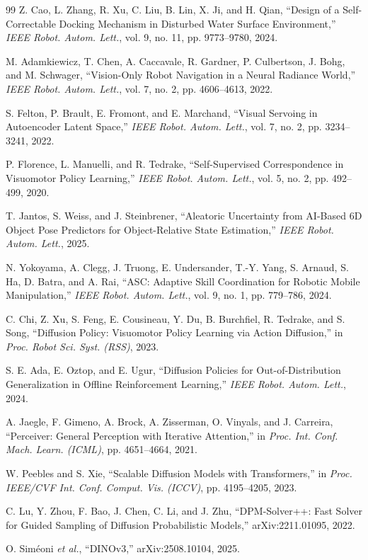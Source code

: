 \documentclass[letterpaper, 10 pt, conference]{IEEEtran}  %
\begin{document}
\begin{thebibliography}{99}
 Z. Cao, L. Zhang, R. Xu, C. Liu, B. Lin, X. Ji, and H. Qian, ``Design of a Self-Correctable Docking Mechanism in Disturbed Water Surface Environment,'' \emph{IEEE Robot. Autom. Lett.}, vol. 9, no. 11, pp. 9773--9780, 2024.

 M. Adamkiewicz, T. Chen, A. Caccavale, R. Gardner, P. Culbertson, J. Bohg, and M. Schwager, ``Vision-Only Robot Navigation in a Neural Radiance World,'' \emph{IEEE Robot. Autom. Lett.}, vol. 7, no. 2, pp. 4606--4613, 2022.

 S. Felton, P. Brault, E. Fromont, and E. Marchand, ``Visual Servoing in Autoencoder Latent Space,'' \emph{IEEE Robot. Autom. Lett.}, vol. 7, no. 2, pp. 3234--3241, 2022.

 P. Florence, L. Manuelli, and R. Tedrake, ``Self-Supervised Correspondence in Visuomotor Policy Learning,'' \emph{IEEE Robot. Autom. Lett.}, vol. 5, no. 2, pp. 492--499, 2020.

 T. Jantos, S. Weiss, and J. Steinbrener, ``Aleatoric Uncertainty from AI-Based 6D Object Pose Predictors for Object-Relative State Estimation,'' \emph{IEEE Robot. Autom. Lett.}, 2025.

 N. Yokoyama, A. Clegg, J. Truong, E. Undersander, T.-Y. Yang, S. Arnaud, S. Ha, D. Batra, and A. Rai, ``ASC: Adaptive Skill Coordination for Robotic Mobile Manipulation,'' \emph{IEEE Robot. Autom. Lett.}, vol. 9, no. 1, pp. 779--786, 2024.

 C. Chi, Z. Xu, S. Feng, E. Cousineau, Y. Du, B. Burchfiel, R. Tedrake, and S. Song, ``Diffusion Policy: Visuomotor Policy Learning via Action Diffusion,'' in \emph{Proc. Robot Sci. Syst. (RSS)}, 2023.

 S. E. Ada, E. Oztop, and E. Ugur, ``Diffusion Policies for Out-of-Distribution Generalization in Offline Reinforcement Learning,'' \emph{IEEE Robot. Autom. Lett.}, 2024.

 A. Jaegle, F. Gimeno, A. Brock, A. Zisserman, O. Vinyals, and J. Carreira, ``Perceiver: General Perception with Iterative Attention,'' in \emph{Proc. Int. Conf. Mach. Learn. (ICML)}, pp. 4651--4664, 2021.

 W. Peebles and S. Xie, ``Scalable Diffusion Models with Transformers,'' in \emph{Proc. IEEE/CVF Int. Conf. Comput. Vis. (ICCV)}, pp. 4195--4205, 2023.

 C. Lu, Y. Zhou, F. Bao, J. Chen, C. Li, and J. Zhu, ``DPM-Solver++: Fast Solver for Guided Sampling of Diffusion Probabilistic Models,'' arXiv:2211.01095, 2022.

 O. Sim\'eoni \emph{et al.}, ``DINOv3,'' arXiv:2508.10104, 2025.

\end{thebibliography}
\end{document}
